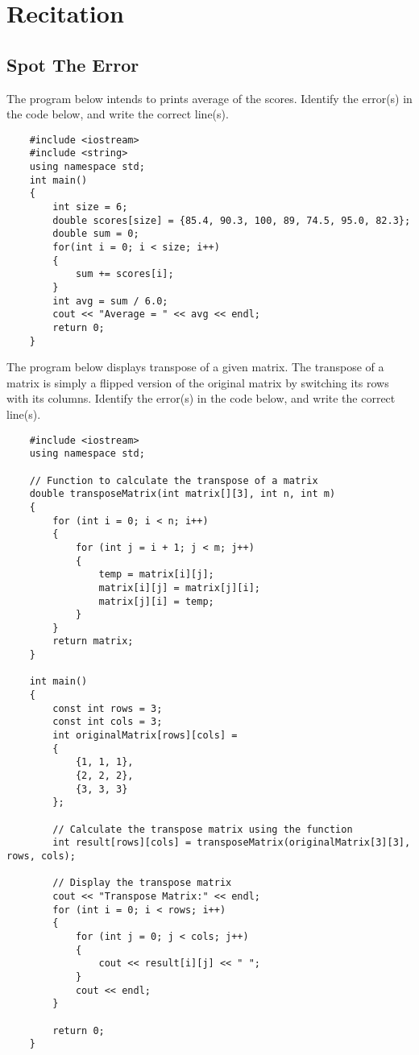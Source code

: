 \section{Recitation}

\subsection{Spot The Error}
\begin{multipart}
The program below intends to prints average of the scores. Identify the error(s) in the code below, and write the correct line(s).
\end{multipart}

\begin{verbatim}
    #include <iostream>
    #include <string> 
    using namespace std;
    int main()
    {
        int size = 6;
        double scores[size] = {85.4, 90.3, 100, 89, 74.5, 95.0, 82.3};
        double sum = 0;
        for(int i = 0; i < size; i++)
        {
            sum += scores[i];
        }
        int avg = sum / 6.0;
        cout << "Average = " << avg << endl;
        return 0; 
    }
\end{verbatim}

\begin{multipart}
The program below displays transpose of a given matrix. The transpose of a matrix is simply a flipped version of the original matrix by switching its rows with its columns. Identify the error(s) in the code below, and write the correct line(s).
\end{multipart}

\begin{verbatim}
    #include <iostream>
    using namespace std;
    
    // Function to calculate the transpose of a matrix
    double transposeMatrix(int matrix[][3], int n, int m) 
    { 
        for (int i = 0; i < n; i++)
        {
            for (int j = i + 1; j < m; j++)
            {
                temp = matrix[i][j];
                matrix[i][j] = matrix[j][i];
                matrix[j][i] = temp;
            }
        }
        return matrix;
    } 
    
    int main() 
    {
        const int rows = 3;
        const int cols = 3;
        int originalMatrix[rows][cols] = 
        {
            {1, 1, 1},
            {2, 2, 2},
            {3, 3, 3}
        };
    
        // Calculate the transpose matrix using the function
        int result[rows][cols] = transposeMatrix(originalMatrix[3][3], rows, cols);
    
        // Display the transpose matrix
        cout << "Transpose Matrix:" << endl;
        for (int i = 0; i < rows; i++) 
        {
            for (int j = 0; j < cols; j++) 
            {
                cout << result[i][j] << " ";
            }
            cout << endl;
        }
    
        return 0;
    }
\end{verbatim}


